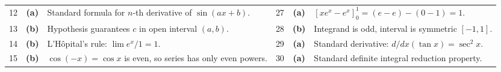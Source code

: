 \begin{table}[htbp]
\begin{tabularx}{\textwidth}{l c X l c X}
12 & \textbf{(a)} & Standard formula for $n$-th derivative of $\sin(ax+b)$. & 27 & \textbf{(a)} & $[x e^x - e^x]_0^1 = (e - e) - (0 - 1) = 1$. \\
13 & \textbf{(b)} & Hypothesis guarantees $c$ in open interval $(a,b)$. & 28 & \textbf{(b)} & Integrand is odd, interval is symmetric $[-1, 1]$. \\
14 & \textbf{(b)} & L'H\^opital's rule: $\lim e^x / 1 = 1$. & 29 & \textbf{(a)} & Standard derivative: $d/dx(\tan x) = \sec^2 x$. \\
15 & \textbf{(b)} & $\cos(-x) = \cos x$ is even, so series has only even powers. & 30 & \textbf{(a)} & Standard definite integral reduction property. \\
\bottomrule
\end{tabularx}
\end{table}
